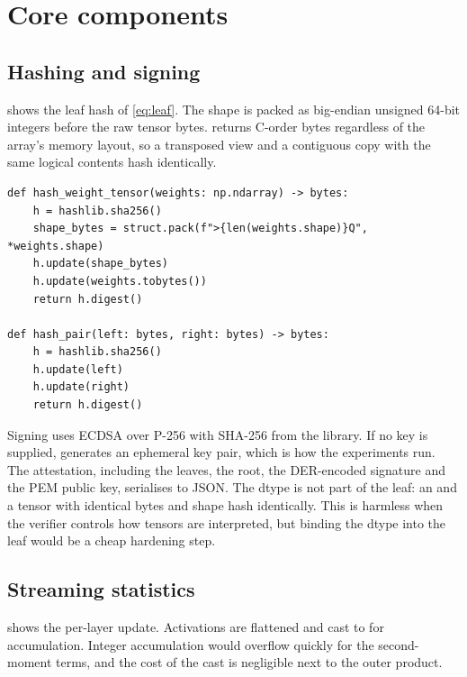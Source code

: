 \section{Core components}
\label{sec:impl:core}

\subsection{Hashing and signing}

 shows the leaf hash of \cref{eq:leaf}. The shape is packed as big-endian
unsigned 64-bit integers before the raw tensor bytes.  returns C-order bytes
regardless of the array's memory layout, so a transposed view and a contiguous copy with the
same logical contents hash identically.

\begin{lstlisting}[caption={Leaf hashing (\code{utils/crypto.py}).},label={lst:hash}]
def hash_weight_tensor(weights: np.ndarray) -> bytes:
    h = hashlib.sha256()
    shape_bytes = struct.pack(f">{len(weights.shape)}Q", *weights.shape)
    h.update(shape_bytes)
    h.update(weights.tobytes())
    return h.digest()

def hash_pair(left: bytes, right: bytes) -> bytes:
    h = hashlib.sha256()
    h.update(left)
    h.update(right)
    return h.digest()
\end{lstlisting}

Signing uses ECDSA over P-256 with SHA-256 from the  library. If no key is
supplied,  generates an ephemeral key pair, which is how
the experiments run. The attestation, including the leaves, the root, the DER-encoded
signature and the PEM public key, serialises to JSON. The dtype is not part of the leaf: an
 and a  tensor with identical bytes and shape hash identically. This is
harmless when the verifier controls how tensors are interpreted, but binding the dtype into the
leaf would be a cheap hardening step.

\subsection{Streaming statistics}

 shows the per-layer update. Activations are flattened and cast to
 for accumulation. Integer accumulation would overflow quickly for the
second-moment terms, and the cost of the cast is negligible next to the outer product.

